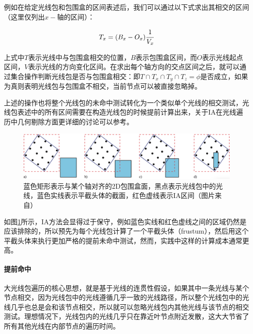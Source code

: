 例如在给定光线包和包围盒的区间表述后，我们可以通过以下式求出其相交的区间（这里仅列出$x-$轴的区间）：

\begin{equation}
	T_x=(B_x-O_x) \cfrac{1}{V_x}
\end{equation}

\noindent 上式中$T$表示光线中与包围盒相交的位置，$B$表示包围盒区间，而$O$表示光线起点区间，$V$表示光线的方向变化区间。在求出每个轴方向的交点区间之后，就可以通过集合操作判断光线包是否与包围盒相交：即$T\cap T_x \cap T_y \cap T_z=\phi$是否成立，如果为真则表明光线包与包围盒不相交，当前节点可以被直接忽略掉。

上述的操作也将整个光线包的未命中测试转化为一个类似单个光线的相交测试，光线包表述中的所有区间需要在构造光线包的时候提前计算出来，关于IA在光线遍历中几何剔除方面更详细的讨论可以参考\cite{a:GeometricandArithmeticCullingMethodsforEntireRayPackets}。

\begin{figure}
	\includegraphics[width=1.0\textwidth]{figures/pt/conservative-early-miss}
	\caption{蓝色矩形表示与某个轴对齐的2D包围盒面，黑点表示光线包中的光线，蓝色实线表示平截头体的截面，红色虚线表示IA区间（图片来自\cite{a:RayTracingDeformableScenesUsingDynamicBoundingVolumeHierarchies}）}
	\label{f:pt-conservative-early-miss}
\end{figure}

如图\ref{f:pt-conservative-early-miss}所示，IA方法会显得过于保守，例如蓝色实线和红色虚线之间的区域仍然是应该排除的，所以\cite{a:RayTracingDeformableScenesUsingDynamicBoundingVolumeHierarchies}预先为每个光线包计算了一个平截头体（frustum），然后用这个平截头体来执行更加严格的提前未命中测试，然而，实践中这样的计算成本通常更高。









\paragraph{提前命中}
大光线包遍历的核心思想，就是基于光线的连贯性假设，如果其中一条光线与某个节点相交，因为光线包中的光线遵循几乎一致的光线路径，所以整个光线包中的光线几乎也总是会和该节点相交，所以就可以忽略光线包内其他光线与该节点的相交测试。理想情况下，光线包内的光线几乎只在靠近叶节点附近发散，这大大节省了所有其他光线在内部节点的遍历时间。

